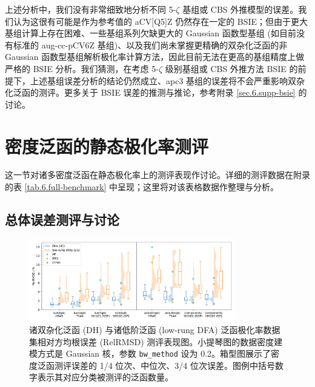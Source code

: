 上述分析中，我们没有非常细致地分析不同 5-$\zeta$ 基组或 CBS 外推模型的误差。我们认为这很有可能是作为参考值的 aCV[Q5]Z 仍然存在一定的 BSIE；但由于更大基组计算上存在困难、一些基组系列欠缺更大的 Gaussian 函数型基组 (如目前没有标准的 aug-cc-pCV6Z 基组)、以及我们尚未掌握更精确的双杂化泛函的非 Gaussian 函数型基组解析极化率计算方法\cite{Brakestad-Frediani.JCTC.2020}，因此目前无法在更高的基组精度上做严格的 BSIE 分析。我们猜测，在考虑 5-$\zeta$ 级别基组或 CBS 外推方法 BSIE 的前提下，上述基组误差分析的结论仍然成立、apc3 基组的误差将不会严重影响双杂化泛函的测评。更多关于 BSIE 误差的推测与推论，参考附录 \ref{sec.6.supp-bsie} 的讨论。

\section{密度泛函的静态极化率测评}
\label{sec.6.benchmark}

这一节对诸多密度泛函在静态极化率上的测评表现作讨论。详细的测评数据在附录的表 \ref{tab.6.full-benchmark} 中呈现；这里将对该表格数据作整理与分析。

\subsection{总体误差测评与讨论}

\begin{figure}[!t]
    \centering
    \includegraphics[width=0.8\textwidth]{assets/benchmark-compare-dh-low.pdf}
    \caption[诸泛函极化率 RelRMSD 测评表现图]{诸双杂化泛函 (DH) 与诸低阶泛函 (low-rung DFA) 泛函极化率数据集相对方均根误差 (RelRMSD) 测评表现图。小提琴图的数据密度建模方式是 Gaussian 核，参数 \texttt{bw\_method} 设为 0.2。箱型图展示了密度泛函测评误差的 1/4 位次、中位次、3/4 位次误差。图例中括号数字表示其对应分类被测评的泛函数量。}
    \label{fig.6.benchmark-compare-dh-low}
\end{figure}

